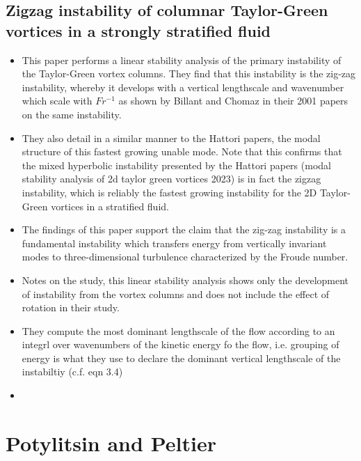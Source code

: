 \documentclass{article}
\begin{document}
    \subsection{Zigzag instability of columnar Taylor-Green vortices in a
    strongly stratified fluid}
    \begin{itemize}
        \item This paper performs a linear stability analysis of the primary
        instability of the Taylor-Green vortex columns. They find that this
        instability is the zig-zag instability, whereby it develops with a
        vertical lengthscale and wavenumber which scale with $Fr^{-1}$ as shown
        by Billant and Chomaz in their 2001 papers on the same instability. 
        \item They also detail in a similar manner to the Hattori papers, the
        modal structure of this fastest growing unable mode. Note that this
        confirms that the mixed hyperbolic instability presented by the Hattori
        papers (modal stability analysis of 2d taylor green vortices 2023) is in
        fact the zigzag instability, which is reliably the fastest growing
        instability for the 2D Taylor-Green vortices in a stratified fluid. 
        \item The findings of this paper support the claim that the zig-zag
        instability is a fundamental instability which transfers energy from
        vertically invariant modes to three-dimensional turbulence characterized
        by the Froude number. 
        \item Notes on the study, this linear stability analysis shows only the
        development of instability from the vortex columns and does not include
        the effect of rotation in their study. 
        \item They compute the most dominant lengthscale of the flow according
        to an integrl over wavenumbers of the kinetic energy fo the flow, i.e.
        grouping of energy is what they use to declare the dominant vertical
        lengthscale of the instabiltiy (c.f. eqn 3.4)
        \item 
    \end{itemize}

\section{Potylitsin and Peltier}
\end{document}
